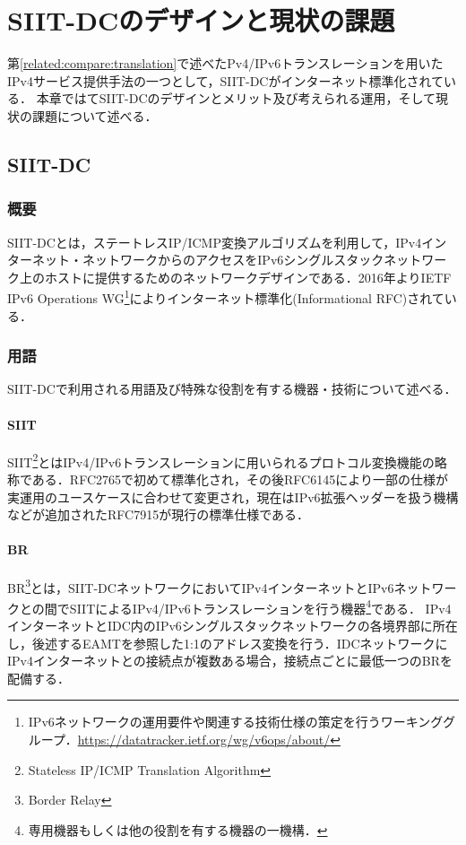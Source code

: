 \chapter{SIIT-DCのデザインと現状の課題}
\label{issue}
第\ref{related:compare:translation}で述べたPv4/IPv6トランスレーションを用いたIPv4サービス提供手法の一つとして，SIIT-DCがインターネット標準化されている．
本章ではてSIIT-DCのデザインとメリット及び考えられる運用，そして現状の課題について述べる．
\section{SIIT-DC}
\label{issue:siit-dc}


\subsection{概要}
SIIT-DCとは，ステートレスIP/ICMP変換アルゴリズム\cite{RFC7915}を利用して，IPv4インターネット・ネットワークからのアクセスをIPv6シングルスタックネットワーク上のホストに提供するためのネットワークデザインである．2016年よりIETF IPv6 Operations WG\footnote{IPv6ネットワークの運用要件や関連する技術仕様の策定を行うワーキンググループ．\url{https://datatracker.ietf.org/wg/v6ops/about/}}によりインターネット標準化(Informational RFC)されている\cite{RFC7755}．


\subsection{用語}
\label{issue:siit-dc:terms}
SIIT-DCで利用される用語及び特殊な役割を有する機器・技術について述べる．

\subsubsection{SIIT}
SIIT\footnote{Stateless IP/ICMP Translation Algorithm}とはIPv4/IPv6トランスレーションに用いられるプロトコル変換機能の略称である．RFC2765\cite{RFC2765}で初めて標準化され，その後RFC6145\cite{RFC6145}により一部の仕様が実運用のユースケースに合わせて変更され，現在はIPv6拡張ヘッダーを扱う機構などが追加されたRFC7915\cite{RFC7915}が現行の標準仕様である．

\subsubsection{BR}
BR\footnote{Border Relay}とは，SIIT-DCネットワークにおいてIPv4インターネットとIPv6ネットワークとの間でSIITによるIPv4/IPv6トランスレーションを行う機器\footnote{専用機器もしくは他の役割を有する機器の一機構．}である．
IPv4インターネットとIDC内のIPv6シングルスタックネットワークの各境界部に所在し，後述するEAMTを参照した1:1のアドレス変換を行う．IDCネットワークにIPv4インターネットとの接続点が複数ある場合，接続点ごとに最低一つのBRを配備する．

